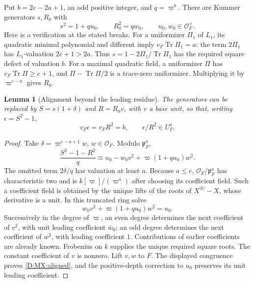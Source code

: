 \documentclass[11pt]{amsart}
\newtheorem{lemma}[theorem]{Lemma}
\theoremstyle{definition}
\theoremstyle{remark}
\newcommand{\Tr}{\operatorname{Tr}}
\newcommand{\OO}{\mathcal O}\newcommand{\pp}{\mathfrak p}\newcommand{\PP}{\mathfrak P}
\begin{document}
Put $b=2e-2a+1$, an odd positive integer, and $q=\varpi^b$.
There are Kummer generators $s,R_0$ with
\[
 s^2=1+q u_0,\qquad R_0^2=q w_0,\qquad u_0,w_0\in\OO_F^\times.
\]
Here is a verification at the stated breaks. For a uniformizer $\Pi_1$
of $L_1$, its quadratic minimal polynomial and different imply
$v_F\Tr\Pi_1=a$: the term $2\Pi_1$ has $L_1$-valuation $2e+1>2a$.
Thus $s=1-2\Pi_1/\Tr\Pi_1$ has the required square defect of valuation
$b$. For a maximal quadratic field, a uniformizer $\Pi$ has
$v_F\Tr\Pi\ge e+1$, and $\Pi-\Tr\Pi/2$ is a trace-zero uniformizer.
Multiplying it by $\varpi^{e-a}$ gives $R_0$.

\begin{lemma}[Alignment beyond the leading residue]\label{D:MX:align}
The generators can be replaced by $S=s(1+\delta)$ and $R=R_0v$,
with $v$ a base unit, so that, writing $\epsilon=S^2-1$,
\begin{equation}\label{D:MX:aligned}
 v_F\epsilon=v_FR^2=b,\qquad
 \epsilon/R^2\in U_F^a.
\end{equation}
\end{lemma}
\begin{proof}
Take $\delta=\varpi^{e-a+1}w$, $w\in\OO_F$. Modulo $\pp_F^a$,
\[
 \frac{S^2-1-R^2}{q}
 \equiv u_0-w_0v^2+\varpi(1+q u_0)w^2.
\]
The omitted term $2\delta/q$ has valuation at least $a$.
Because $a\le e$, $\OO_F/\pp_F^a$ has characteristic two and is
$k[\varpi]/(\varpi^a)$ after choosing its coefficient field. Such a
coefficient field is obtained by the unique lifts of the roots of
$X^{|k|}-X$, whose derivative is a unit.
In this truncated ring solve
\[
 w_0v^2+\varpi(1+q u_0)w^2=u_0.
\]
Successively in the degree of $\varpi$, an even degree determines the next
coefficient of $v^2$, with unit leading coefficient $\bar w_0$; an odd
degree determines the next coefficient of $w^2$, with leading coefficient
$1$. Contributions of earlier coefficients are already known. Frobenius
on $k$ supplies the unique required square roots. The constant coefficient
of $v$ is nonzero. Lift $v,w$ to $F$. The displayed congruence proves
\eqref{D:MX:aligned}, and the positive-depth correction to $u_0$ preserves its
unit leading coefficient.
\end{proof}
\end{document}
